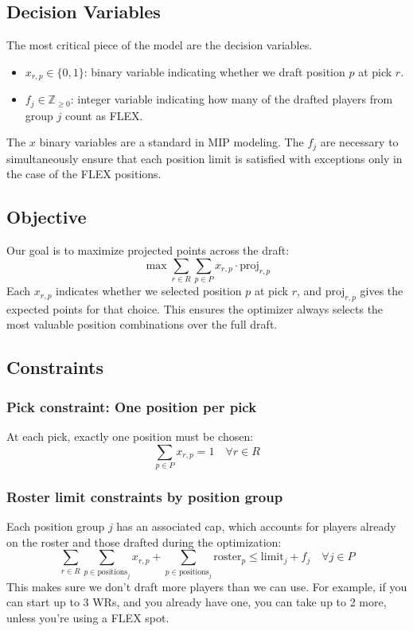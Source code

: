 \documentclass{article}
\begin{document}
\subsection*{Decision Variables}
The most critical piece of the model are the decision variables.
\begin{itemize}
  \item \( x_{r,p} \in \{0,1\} \): binary variable indicating whether we draft position \( p \) at pick \( r \).
  \item \( f_j \in \mathbb{Z}_{\geq 0} \): integer variable indicating how many of the drafted players from group \( j \) count as FLEX.
\end{itemize}
The $x$ binary variables are a standard in MIP modeling.  The $f_j$ are necessary to simultaneously ensure that each position limit is satisfied with exceptions only in the case of the FLEX positions.

\subsection*{Objective}
Our goal is to maximize projected points across the draft:
\[
\max \sum_{r \in R} \sum_{p \in P} x_{r,p} \cdot \text{proj}_{r,p}
\]
Each \( x_{r,p} \) indicates whether we selected position \( p \) at pick \( r \), and \( \text{proj}_{r,p} \) gives the expected points for that choice.
This ensures the optimizer always selects the most valuable position combinations over the full draft.

\subsection*{Constraints}

\subsubsection*{Pick constraint: One position per pick}
At each pick, exactly one position must be chosen:
\[
\sum_{p \in P} x_{r,p} = 1 \quad \forall r \in R
\]

\subsubsection*{Roster limit constraints by position group}
Each position group \( j \) has an associated cap, which accounts for players already on the roster and those drafted during the optimization:
\[
\sum_{r \in R} \sum_{p \in \text{positions}_j} x_{r,p} + \sum_{p \in \text{positions}_j} \text{roster}_p \leq \text{limit}_j + f_j \quad \forall j\in P
\]
This makes sure we don't draft more players than we can use. For example, if you can start up to 3 WRs, and you already have one, you can take up to 2 more, unless you're using a FLEX spot.
\end{document}
